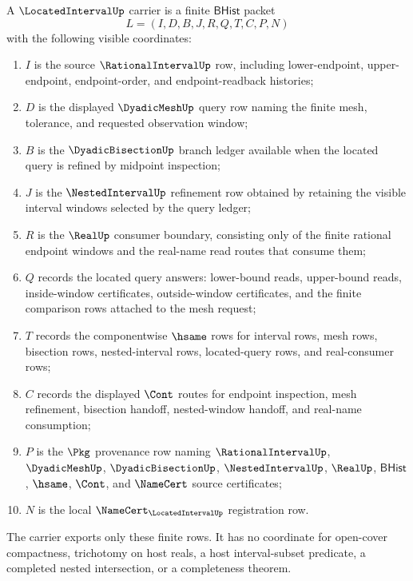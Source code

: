 \begin{definition}
\label{def:locatedinterval-bhist-carrier}
A $\LocatedIntervalUp$ carrier is a finite $\mathsf{BHist}$ packet
$$
L=(I,D,B,J,R,Q,T,C,P,N)
$$
with the following visible coordinates:
\begin{enumerate}
\item $I$ is the source $\RationalIntervalUp$ row, including lower-endpoint, upper-endpoint, endpoint-order, and endpoint-readback histories;
\item $D$ is the displayed $\DyadicMeshUp$ query row naming the finite mesh, tolerance, and requested observation window;
\item $B$ is the $\DyadicBisectionUp$ branch ledger available when the located query is refined by midpoint inspection;
\item $J$ is the $\NestedIntervalUp$ refinement row obtained by retaining the visible interval windows selected by the query ledger;
\item $R$ is the $\RealUp$ consumer boundary, consisting only of the finite rational endpoint windows and the real-name read routes that consume them;
\item $Q$ records the located query answers: lower-bound reads, upper-bound reads, inside-window certificates, outside-window certificates, and the finite comparison rows attached to the mesh request;
\item $T$ records the componentwise $\hsame$ rows for interval rows, mesh rows, bisection rows, nested-interval rows, located-query rows, and real-consumer rows;
\item $C$ records the displayed $\Cont$ routes for endpoint inspection, mesh refinement, bisection handoff, nested-window handoff, and real-name consumption;
\item $P$ is the $\Pkg$ provenance row naming $\RationalIntervalUp$, $\DyadicMeshUp$, $\DyadicBisectionUp$, $\NestedIntervalUp$, $\RealUp$, $\mathsf{BHist}$, $\hsame$, $\Cont$, and $\NameCert$ source certificates;
\item $N$ is the local $\NameCert_{\LocatedIntervalUp}$ registration row.
\end{enumerate}
The carrier exports only these finite rows. It has no coordinate for open-cover compactness, trichotomy on host reals, a host interval-subset predicate, a completed nested intersection, or a completeness theorem.
\end{definition}

